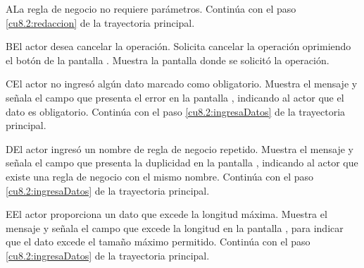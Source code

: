  
 \begin{UCtrayectoriaA}{A}{La regla de negocio no requiere parámetros.}
	\UCpaso[] Continúa con el paso \ref{cu8.2:redaccion} de la trayectoria principal.
 \end{UCtrayectoriaA}
 \begin{UCtrayectoriaA}{B}{El actor desea cancelar la operación.}
    \UCpaso[\UCactor] Solicita cancelar la operación oprimiendo el botón  de la pantalla .
    \UCpaso[\UCsist] Muestra la pantalla donde se solicitó la operación.
 \end{UCtrayectoriaA}
 \begin{UCtrayectoriaA}{C}{El actor no ingresó algún dato marcado como obligatorio.}
    \UCpaso[\UCsist] Muestra el mensaje  y señala el campo que presenta el error en la pantalla 
	    , indicando al actor que el dato es obligatorio.
    \UCpaso[] Continúa con el paso \ref{cu8.2:ingresaDatos} de la trayectoria principal.
 \end{UCtrayectoriaA}
 \begin{UCtrayectoriaA}{D}{El actor ingresó un nombre de regla de negocio repetido.}
    \UCpaso[\UCsist] Muestra el mensaje  y señala el campo que presenta la duplicidad en la pantalla 
	    , indicando al actor que existe una regla de negocio con el mismo nombre.
    \UCpaso[] Continúa con el paso \ref{cu8.2:ingresaDatos} de la trayectoria principal.
 \end{UCtrayectoriaA}
 
 \begin{UCtrayectoriaA}{E}{El actor proporciona un dato que excede la longitud máxima.}
    \UCpaso[\UCsist] Muestra el mensaje  y señala el campo que excede la 
    longitud en la pantalla , para indicar que el dato excede el tamaño máximo permitido.
    \UCpaso[] Continúa con el paso \ref{cu8.2:ingresaDatos} de la trayectoria principal.
 \end{UCtrayectoriaA}
 
